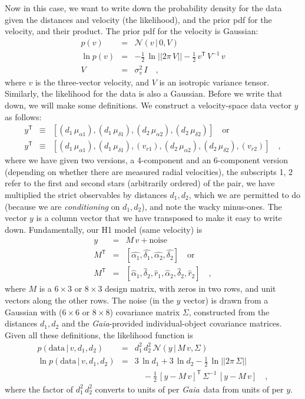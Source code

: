 \documentclass[manuscript, letterpaper]{aastex6}
\newcommand{\project}[1]{\textsl{#1}}
\newcommand{\gaia}{\project{Gaia}}
\newcommand{\given}{\,|\,}
\newcommand{\normal}{{\mathcal{N}}}
\newcommand{\transp}[1]{{#1}^{\!\mathsf{T}}}
\newcommand{\inv}[1]{{#1}^{-1}}
\newcommand{\data}{\mathrm{data}}
\begin{document}
Now in this case, we want to write down the probability density for the data
given the distances and velocity (the likelihood), and the prior pdf for
the velocity, and their product.
The prior pdf for the velocity is Gaussian:
\begin{eqnarray}
  p(v) &=& \normal(v\given 0,V)
  \\
  \ln p(v) &=& -\frac{1}{2}\,\ln||2\pi\,V|| -\frac{1}{2}\,\transp{v}\,\inv{V}\,v
  \\
  V &=& \sigma_v^2\,I
  \quad ,
\end{eqnarray}
where $v$ is the three-vector velocity, and $V$ is an isotropic
variance tensor.
Similarly, the likelihood for the data is also a Gaussian.
Before we write that down, we will make some definitions.
We construct a velocity-space data vector $y$ as follows:
\begin{eqnarray}
  \transp{y} &\equiv& [(d_1\,\mu_{\alpha1}), (d_1\,\mu_{\delta1}),
                       (d_2\,\mu_{\alpha2}), (d_2\,\mu_{\delta2})] \quad \mbox{or}
  \\
  \transp{y} &\equiv& [(d_1\,\mu_{\alpha1}), (d_1\,\mu_{\delta1}), (v_{r1}),
                       (d_2\,\mu_{\alpha2}), (d_2\,\mu_{\delta2}), (v_{r2})]
  \quad ,
\end{eqnarray}
where we have given two versions, a 4-component and an 6-component
version (depending on whether there are measured radial velocities),
the subscripts 1, 2 refer to the first and second stars (arbitrarily
ordered) of the pair, we have multiplied the strict observables by
distances $d_1, d_2$, which we are permitted to do (because we are
\emph{conditioning} on $d_1, d_2$), and note the wacky minus-ones.
The vector $y$ is a column vector that we have transposed to make it
easy to write down.
Fundamentally, our H1 model (same velocity) is
\begin{eqnarray}
  y &=& M\,v + \mathrm{noise}
  \\
  \transp{M} &=& [\hat{\alpha_1}, \hat{\delta_1},
                  \hat{\alpha_2}, \hat{\delta_2}] \quad \mbox{or}
  \\
  \transp{M} &=& [\hat{\alpha}_1, \hat{\delta}_2, \hat{r}_1,
                  \hat{\alpha}_2, \hat{\delta}_2, \hat{r}_2]
  \quad,
\end{eqnarray}
where $M$ is a $6\times 3$ or $8\times 3$ design matrix, with zeros
in two rows, and unit vectors along the other rows.
The noise (in the $y$ vector) is drawn from a Gaussian with ($6\times 6$ or $8\times 8$)
covariance matrix $\Sigma$, constructed from the distances $d_1, d_2$ and
the \gaia-provided individual-object covariance matrices.
Given all these definitions, the likelihood function is
\begin{eqnarray}
  p(\data\given v,d_1,d_2) &=& d_1^2\,d_2^2\,\normal(y\given M\,v, \Sigma)
  \\
  \ln p(\data\given v,d_1,d_2) &=& 3\,\ln d_1 + 3\,\ln d_2
  -\frac{1}{2}\,\ln||2\pi\,\Sigma|| \nonumber \\ && \quad
  -\frac{1}{2}\,\transp{[y-M\,v]}\,\inv{\Sigma}\,[y-M\,v]
  \quad ,
\end{eqnarray}
where the factor of $d_1^2\,d_2^2$ converts to units of per \gaia\ data
from units of per $y$.
\end{document}
